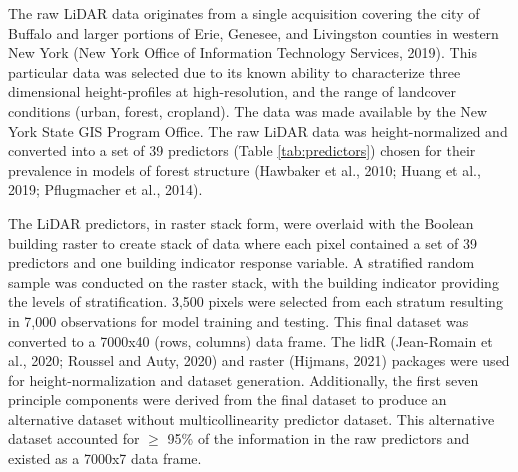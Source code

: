 \documentclass[]{elsarticle} %
\begin{document}
The raw LiDAR data originates from a single acquisition covering the city
of Buffalo and larger portions of Erie, Genesee, and Livingston counties in
western New York (New York Office of Information Technology Services, 2019).
This particular data was selected due to its known ability to characterize
three dimensional height-profiles at high-resolution, and the range of
landcover conditions (urban, forest, cropland).
The data was made available by the New York State GIS Program Office.
The raw LiDAR data was height-normalized and converted into a set of 39
predictors (Table \ref{tab:predictors}) chosen for their prevalence in models
of forest structure (Hawbaker et al., 2010; Huang et al., 2019; Pflugmacher et al., 2014).

The LiDAR predictors, in raster stack form, were overlaid with the Boolean
building raster to create stack of data where each pixel contained a set of 39
predictors and one building indicator response variable.
A stratified random sample was conducted on the raster stack, with the building
indicator providing the levels of stratification.
3,500 pixels were selected from each stratum resulting in 7,000 observations for
model training and testing.
This final dataset was converted to a 7000x40 (rows, columns) data frame.
The lidR (Jean-Romain et al., 2020; Roussel and Auty, 2020) and raster (Hijmans, 2021) packages were used for
height-normalization and dataset generation.
Additionally, the first seven principle components were derived from the final
dataset to produce an alternative dataset without multicollinearity predictor
dataset.
This alternative dataset accounted for \(\ge\) 95\% of the information in the raw
predictors and existed as a 7000x7 data frame.
\end{document}
